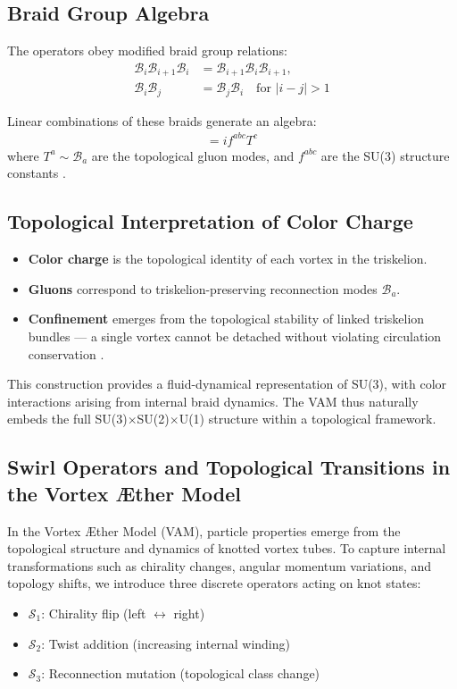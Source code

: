 \subsection*{Braid Group Algebra}

The operators obey modified braid group relations:
\begin{align}
\mathcal{B}_i \mathcal{B}_{i+1} \mathcal{B}_i &= \mathcal{B}_{i+1} \mathcal{B}_i \mathcal{B}_{i+1}, \\
\mathcal{B}_i \mathcal{B}_j &= \mathcal{B}_j \mathcal{B}_i \quad \text{for } |i-j| > 1
\end{align}

Linear combinations of these braids generate an algebra:
\begin{align}
[T^a, T^b] = i f^{abc} T^c
\end{align}
where \( T^a \sim \mathcal{B}_a \) are the topological gluon modes, and \( f^{abc} \) are the SU(3) structure constants \cite{witten1989quantum}.

\subsection*{Topological Interpretation of Color Charge}

\begin{itemize}
    \item \textbf{Color charge} is the topological identity of each vortex in the triskelion.
    \item \textbf{Gluons} correspond to triskelion-preserving reconnection modes \( \mathcal{B}_a \).
    \item \textbf{Confinement} emerges from the topological stability of linked triskelion bundles — a single vortex cannot be detached without violating circulation conservation \cite{kauffman1991knots, faddeev1997knots}.
\end{itemize}

This construction provides a fluid-dynamical representation of SU(3), with color interactions arising from internal braid dynamics. The VAM thus naturally embeds the full SU(3)$\times$SU(2)$\times$U(1) structure within a topological framework.

\subsection{Swirl Operators and Topological Transitions in the Vortex Æther Model}

In the Vortex Æther Model (VAM), particle properties emerge from the topological structure and dynamics of knotted vortex tubes. To capture internal transformations such as chirality changes, angular momentum variations, and topology shifts, we introduce three discrete operators acting on knot states:
\begin{itemize}
    \item $\mathcal{S}_1$: Chirality flip (left $\leftrightarrow$ right)
    \item $\mathcal{S}_2$: Twist addition (increasing internal winding)
    \item $\mathcal{S}_3$: Reconnection mutation (topological class change)
\end{itemize}

